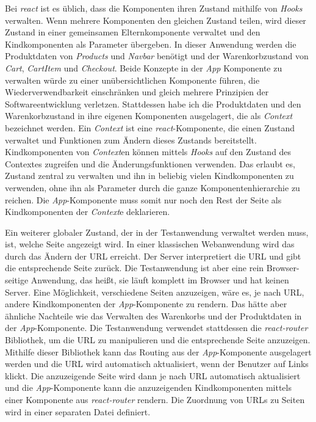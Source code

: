 Bei \textit{react} ist es üblich, dass die Komponenten ihren Zustand mithilfe von \textit{Hooks} verwalten.
Wenn mehrere Komponenten den gleichen Zustand teilen, wird dieser Zustand in einer gemeinsamen Elternkomponente verwaltet und den Kindkomponenten als Parameter übergeben.
In dieser Anwendung werden die Produktdaten von \textit{Products} und \textit{Navbar} benötigt und der Warenkorbzustand von \textit{Cart}, \textit{CartItem} und \textit{Checkout}.
Beide Konzepte in der \textit{App} Komponente zu verwalten würde zu einer unübersichtlichen Komponente führen, die Wiederverwendbarkeit einschränken und gleich mehrere Prinzipien der Softwareentwicklung verletzen.
Stattdessen habe ich die Produktdaten und den Warenkorbzustand in ihre eigenen Komponenten ausgelagert, die als \textit{Context} bezeichnet werden.
Ein \textit{Context} ist eine \textit{react}-Komponente, die einen Zustand verwaltet und Funktionen zum Ändern dieses Zustands bereitstellt.
Kindkomponenten von \textit{Context}en können mittels \textit{Hooks} auf den Zustand des Contextes zugreifen und die Änderungsfunktionen verwenden.
Das erlaubt es, Zustand zentral zu verwalten und ihn in beliebig vielen Kindkomponenten zu verwenden, ohne ihn als Parameter durch die ganze Komponentenhierarchie zu reichen.
Die \textit{App}-Komponente muss somit nur noch den Rest der Seite als Kindkomponenten der \textit{Context}e deklarieren.

Ein weiterer globaler Zustand, der in der Testanwendung verwaltet werden muss, ist, welche Seite angezeigt wird.
In einer klassischen Webanwendung wird das durch das Ändern der URL erreicht.
Der Server interpretiert die URL und gibt die entsprechende Seite zurück.
Die Testanwendung ist aber eine rein Browser-seitige Anwendung, das heißt, sie läuft komplett im Browser und hat keinen Server.
Eine Möglichkeit, verschiedene Seiten anzuzeigen, wäre es, je nach URL, andere Kindkomponenten der \textit{App}-Komponente zu rendern.
Das hätte aber ähnliche Nachteile wie das Verwalten des Warenkorbs und der Produktdaten in der \textit{App}-Komponente.
Die Testanwendung verwendet stattdessen die \textit{react-router} Bibliothek, um die URL zu manipulieren und die entsprechende Seite anzuzeigen.
Mithilfe dieser Bibliothek kann das Routing aus der \textit{App}-Komponente ausgelagert werden und die URL wird automatisch aktualisiert, wenn der Benutzer auf Links klickt.
Die anzuzeigende Seite wird dann je nach URL automatisch aktualisiert und die \textit{App}-Komponente kann die anzuzeigenden Kindkomponenten mittels einer Komponente aus \textit{react-router} rendern.
Die Zuordnung von URLs zu Seiten wird in einer separaten Datei definiert.

